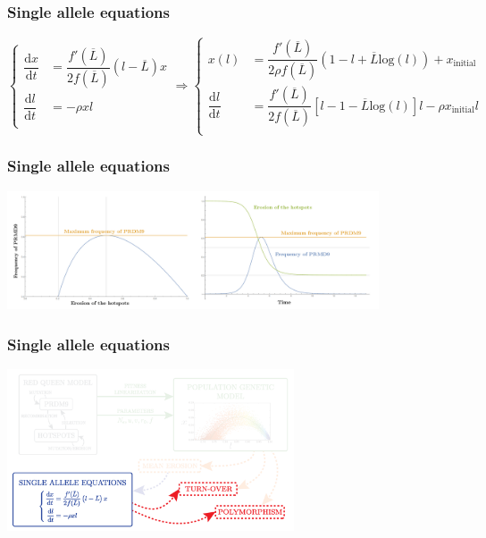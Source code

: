 \documentclass[10pt]{beamer}
\begin{document}
\begin{frame}
\frametitle{Single allele equations}
\begin{equation}
  \left\{
      \begin{aligned}
          \dfrac{\mathrm{d}x}{\mathrm{d}t} &= \dfrac{f'(\overline{L})}{2 f(\overline{L})} \left( l - \overline{L} \right) x \\
        \dfrac{\mathrm{d}l}{\mathrm{d}t} &= 
        - \rho x l \\
      \end{aligned}
    \right.
 \Rightarrow
  \left\{
      \begin{aligned}
          x(l) &=\dfrac{f'(\overline{L})}{2 \rho f(\overline{L})} (1-l + \overline{L} \mathrm{log}(l)) + x_{\mathrm{initial}} \\
        \dfrac{\mathrm{d}l}{\mathrm{d}t} &= 
         \dfrac{f'(\overline{L})}{2 f(\overline{L})} [ l-1- \overline{L} \mathrm{log}(l)]l  - \rho x_{\mathrm{initial}} l \\
      \end{aligned}
    \right.
\end{equation}
\end{frame}

\begin{frame}
\frametitle{Single allele equations}
	\begin{center}
       \includegraphics[width=11cm]{Images/SingleAllele.png}
	\end{center}
\end{frame}



\begin{frame}
\frametitle{Single allele equations}
	\begin{center}
       \includegraphics[width=8.5cm]{Images/overline-5.png}
	\end{center}
\end{frame}
\end{document}
